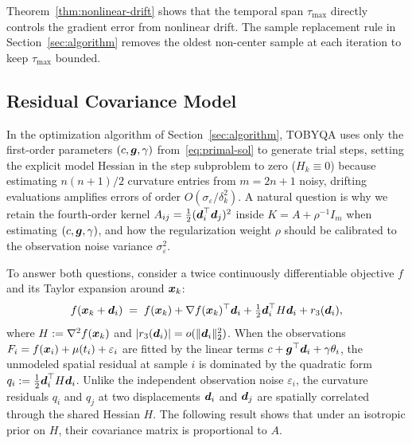\begin{remark}
\label{rem:fifo-bound}
Theorem~\ref{thm:nonlinear-drift} shows that the temporal span $\tau_{\max}$ directly controls the gradient error from nonlinear drift. The sample replacement rule in Section~\ref{sec:algorithm} removes the oldest non-center sample at each iteration to keep $\tau_{\max}$ bounded.
\end{remark}

\subsection{Residual Covariance Model}
\label{sec:statistical-foundation}

In the optimization algorithm of Section~\ref{sec:algorithm}, TOBYQA uses only the first-order parameters $(c, \boldsymbol{g}, \gamma)$ from~\eqref{eq:primal-sol} to generate trial steps, setting the explicit model Hessian in the step subproblem to zero ($H_k \equiv 0$) because estimating $n(n+1)/2$ curvature entries from $m = 2n+1$ noisy, drifting evaluations amplifies errors of order $O(\sigma_\varepsilon / \delta_k^2)$. A natural question is why we retain the fourth-order kernel $A_{ij} = \tfrac{1}{2}(\boldsymbol{d}_i^\top \boldsymbol{d}_j)^2$ inside $K = A + \rho^{-1} I_m$ when estimating $(c, \boldsymbol{g}, \gamma)$, and how the regularization weight $\rho$ should be calibrated to the observation noise variance $\sigma_\varepsilon^2$.

To answer both questions, consider a twice continuously differentiable objective $f$ and its Taylor expansion around $\boldsymbol{x}_k$:
\begin{equation*}
  f(\boldsymbol{x}_k + \boldsymbol{d}_i) \;=\; f(\boldsymbol{x}_k) + \nabla f(\boldsymbol{x}_k)^\top \boldsymbol{d}_i + \tfrac{1}{2} \boldsymbol{d}_i^\top H \boldsymbol{d}_i + r_3(\boldsymbol{d}_i),
\end{equation*}
where $H := \nabla^2 f(\boldsymbol{x}_k)$ and $|r_3(\boldsymbol{d}_i)| = o(\|\boldsymbol{d}_i\|_2^2)$. When the observations $F_i = f(\boldsymbol{x}_i) + \mu(t_i) + \varepsilon_i$ are fitted by the linear terms $c + \boldsymbol{g}^\top \boldsymbol{d}_i + \gamma \theta_i$, the unmodeled spatial residual at sample $i$ is dominated by the quadratic form $q_i := \tfrac{1}{2}\boldsymbol{d}_i^\top H \boldsymbol{d}_i$. Unlike the independent observation noise $\varepsilon_i$, the curvature residuals $q_i$ and $q_j$ at two displacements $\boldsymbol{d}_i$ and $\boldsymbol{d}_j$ are spatially correlated through the shared Hessian $H$. The following result shows that under an isotropic prior on $H$, their covariance matrix is proportional to $A$.


